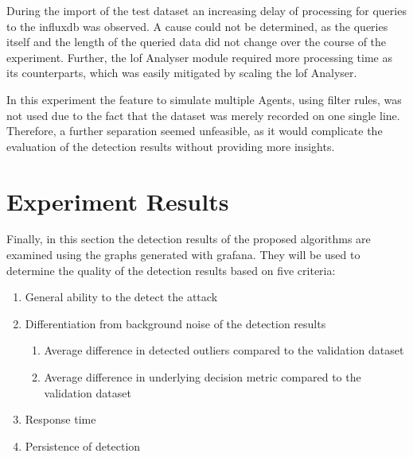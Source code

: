 During the import of the test dataset an increasing delay of processing for queries to the \gls{influxdb} was observed. A cause could not be determined, as the queries itself and the length of the queried data did not change over the course of the experiment.
Further, the \gls{lof} Analyser module required more processing time as its counterparts, which was easily mitigated by scaling the \gls{lof} Analyser.

In this experiment the feature to simulate multiple Agents, using filter rules, was not used due to the fact that the dataset was merely recorded on one single line. Therefore, a further separation seemed unfeasible, as it would complicate the evaluation of the detection results without providing more insights.

\section{Experiment Results}
\label{sec:results:results}

Finally, in this section the detection results of the proposed algorithms are examined using the graphs generated with \gls{grafana}. They will be used to determine the quality of the detection results based on five criteria:

\begin{enumerate}
	\item General ability to the detect the attack
	\item Differentiation from background noise of the detection results
	\begin{enumerate}
		\item Average difference in detected outliers compared to the validation dataset
		\item Average difference in underlying decision metric compared to the validation dataset
	\end{enumerate}
	\item Response time 
	\item Persistence of detection
\end{enumerate}

